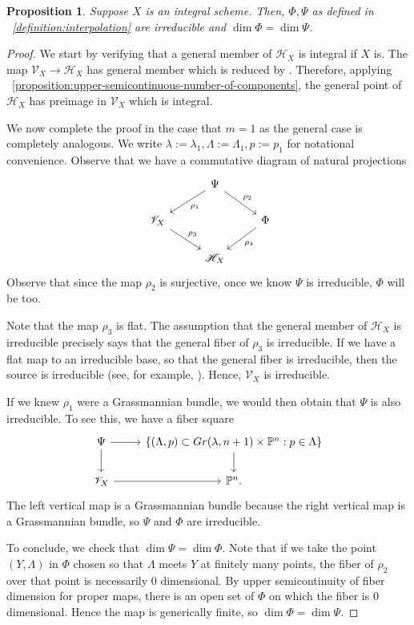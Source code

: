 \documentclass[reqno, 11pt]{amsart}
\theoremstyle{definition}
\theoremstyle{remark}
\numberwithin{equation}{section}
\numberwithin{thm}{section}
\numberwithin{prop}{section}
\numberwithin{lem}{section}
\numberwithin{cor}{section}
\numberwithin{conj}{section}
\numberwithin{defn}{section}
\theoremstyle{plain}
\newtheorem{proposition}[theorem]{Proposition}
\theoremstyle{definition}
\newcommand\bp{{\mathbb P}}
\newcommand\sch{\mathscr H}
\newcommand\scv{\mathscr V}
\newcommand \hilb[1]{\sch_{#1}}
\newcommand \uhilb[1]{\scv_{#1}}
\begin{document}
\begin{proposition}
	\label{proposition:irreducible-and-dimension}
	Suppose $X$ is an integral scheme. Then, $\Phi, \Psi$
	as defined in ~\autoref{definition:interpolation} are irreducible and $\dim \Phi = \dim \Psi$.
\end{proposition}
\begin{proof}
We start by verifying that a general member of $\hilb X$ is integral if $X$ is.
The map $\uhilb X \rightarrow \hilb X$ has general member which is reduced by
\cite[Th\'eor\`eme 12.2.4(v)]{EGAIV.3}.
Therefore, applying 
~\autoref{proposition:upper-semicontinuous-number-of-components},
the general point of $\hilb X$ has preimage in $\uhilb X$ which
is integral.

We now complete the proof in the case that $m = 1$ as
the general case is completely analogous. We write
$\lambda := \lambda_1, \Lambda := \Lambda_1, p := p_1$ for notational
convenience.
Observe that we have a commutative diagram of natural projections
\begin{equation}
	\nonumber
	\begin{tikzcd} 
		\qquad & \Psi \ar {ld}{\rho_1} \ar {rd}{\rho_2} & \\
		\uhilb X \ar {rd}{\rho_3} & & \Phi \ar{ld}{\rho_4} \\
		\qquad & \hilb X &
	\end{tikzcd}\end{equation}
Observe that since the map $\rho_2$ is surjective, once
we know $\Psi$ is irreducible, $\Phi$ will be too.

Note that the map $\rho_3$ is flat. 
The assumption that the general member of $\hilb X$ is irreducible
precisely says that the general fiber of $\rho_3$ is irreducible.
If we have a flat map to an irreducible base, so that
the general fiber is irreducible, then the source is irreducible
(see, for example, \cite[Lemma 3.2.1]{landesman:undergraduate-thesis}).
Hence, $\uhilb X$ is irreducible.

If we knew $\rho_1$ were a Grassmannian bundle, we would then
obtain that $\Psi$ is also irreducible. 
To see this, we have a fiber square
\begin{equation}
	\nonumber
	\begin{tikzcd} 
	  \Psi \ar{r} \ar{d} &  \left\{ \left( \Lambda, p \right) \subset Gr(\lambda, n+1) \times \bp^n: p \in \Lambda \right\}\ar{d} \\
	  \uhilb X \ar{r} & \bp^n.
	\end{tikzcd}\end{equation}
The left vertical map is a Grassmannian bundle because
the right vertical map is a Grassmannian bundle, so $\Psi$ and $\Phi$
are irreducible.

To conclude, we check that
$\dim \Psi = \dim \Phi$.
Note that if we take the point $(Y, \Lambda)$ in $\Phi$ chosen
so that $\Lambda$ meets $Y$ at finitely many points, the fiber
of $\rho_2$ over that point is necessarily $0$ dimensional.
By upper semicontinuity of fiber dimension for proper maps, there is an open
set of $\Phi$ on which the fiber is $0$ dimensional.
Hence the map is generically finite, so $\dim \Phi = \dim \Psi$.
\end{proof}
\end{document}

